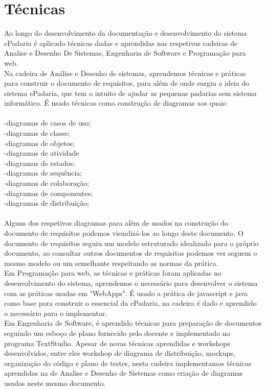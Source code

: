 \section{Técnicas}
Ao longo do desenvolvimento da documentação e desenvolvimento do sistema ePadaria é aplicado técnicas dadas e aprendidas nas respetivas cadeiras de Analise e Desenho De Sistemas, Engenharia de Software e Programação para web.\\
Na cadeira de Análise e Desenho de sistemas, aprendemos técnicas e práticas para construir o documento de requisitos, para além de onde surgiu a ideia do sistema ePadaria, que tem o intuito de ajudar as pequenas padarias sem sistema informático. É usado técnicas como construção de diagramas aos quais:\\ 
\\-diagramas de casos de uso;\\ 
-diagramas de classe;\\
-diagramas de objetos;\\
-diagramas de atividade\\
-diagramas de estados;\\
-diagramas de sequência;\\
-diagramas de colaboração;\\
-diagramas de componentes;\\
-diagramas de distribuição;\\
\\Alguns dos respetivos diagramas para além de usados na construção do documento de requisitos podemos visualizá-los ao longo deste documento. O documento de requisitos seguiu um modelo estruturado idealizado para o próprio documento, ao consultar outros documentos de requisitos podemos ver seguem o mesmo modelo ou um semelhante respeitando as normas da prática.\\
Em Programação para web, as técnicas e práticas foram aplicadas no desenvolvimento do sistema, aprendemos o necessário para desenvolver o sistema com as práticas usadas em "WebApps". É usado a prática de javascript e java como base para construir o essencial da ePadaria, na cadeira é dado e aprendido o necessário para o implementar.\\
Em Engenharia de Software, é aprendido técnicas para preparação de documentos seguindo um esboço de plano fornecido pelo docente e implementado no programa TextStudio. Apesar de novas técnicas aprendidas e workshops desenvolvidos, entre eles workshop de diagrama de distribuição, mockups, organização do código e plano de testes, nesta cadeira implementamos técnicas aprendidas na de Analise e Desenho de Sistemas como criação de diagramas usados neste mesmo documento.\\ 


